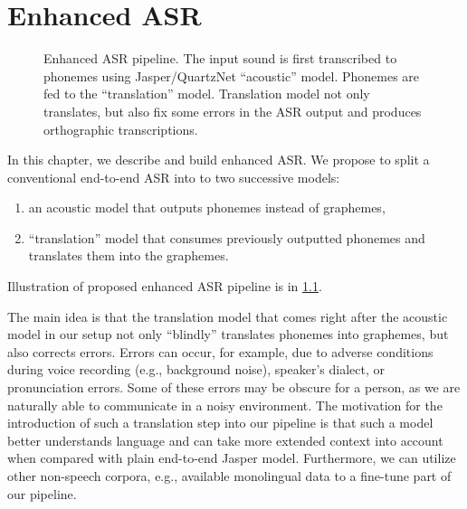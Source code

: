 \chapter{Enhanced ASR}
\label{chap:enhanced_asr}

\begin{figure}[h]
	\centering
	\caption{Enhanced ASR pipeline. The input sound is first transcribed to phonemes using Jasper/QuartzNet ``acoustic'' model. Phonemes are fed to the ``translation'' model. Translation model not only translates, but also fix some errors in the ASR output and produces orthographic transcriptions.}
	\label{fig:asr_enhanced_pipeline}
\end{figure} 


In this chapter, we describe and build enhanced ASR. We propose to split a conventional end-to-end ASR into to two successive models: 

\begin{enumerate}
	\item an acoustic model that outputs phonemes instead of graphemes,
	\item ``translation'' model that consumes previously outputted phonemes and translates them into the graphemes.
\end{enumerate}

Illustration of proposed enhanced ASR pipeline is in \cref{fig:asr_enhanced_pipeline}.

The main idea is that the translation model that comes right after the acoustic model in our setup not only ``blindly'' translates phonemes into graphemes, but also corrects errors. Errors can occur, for example, due to adverse conditions during voice recording (e.g., background noise), speaker's dialect, or pronunciation errors. Some of these errors may be obscure for a person, as we are naturally able to communicate in a noisy environment. The motivation for the introduction of such a translation step into our pipeline is that such a model better understands language and can take more extended context into account when compared with plain end-to-end Jasper model. Furthermore, we can utilize other non-speech corpora, e.g., available monolingual data to a fine-tune part of our pipeline.

